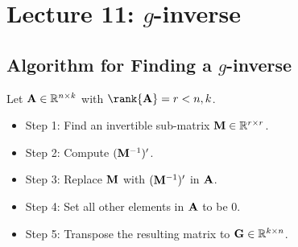 \section{Lecture 11: \texorpdfstring{$ g $}{g}-inverse}
\subsection*{Algorithm for Finding a $ g $-inverse}
Let $ \mathbf{A}\in\mathbb{R}^{n\times k} $ with $ \rank{\Matrix{A}}=r<\min{n,k} $.
\begin{itemize}
    \item Step 1: Find an invertible sub-matrix $ \mathbf{M}\in\mathbb{R}^{r\times r} $.
    \item Step 2: Compute $ (\mathbf{M}^{-1})' $.
    \item Step 3: Replace $ \mathbf{M} $ with $ (\mathbf{M}^{-1})' $ in $ \mathbf{A} $.
    \item Step 4: Set all other elements in $ \mathbf{A} $ to be $ 0 $.
    \item Step 5: Transpose the resulting matrix to $ \mathbf{G}\in\mathbb{R}^{k\times n} $.
\end{itemize}
